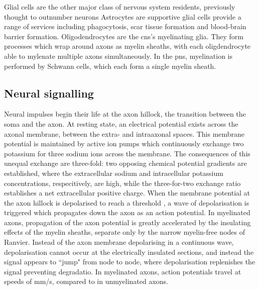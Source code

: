 Glial cells are the other major class of nervous system residents, previously thought to outnumber neurons 
Astrocytes are supportive glial cells provide a range of services including phagocytosis, scar tissue formation and blood-brain barrier formation.
Oligodendrocytes are the \gls{cns}'s myelinating glia.
They form processes which wrap around axons as myelin sheaths, with each oligdendrocyte able to mylenate multiple axons simultaneously.
In the \gls{pns}, myelination is performed by Schwann cells, which each form a single myelin sheath.

\subsection{Neural signalling}

Neural impulses begin their life at the axon hillock, the transition between the soma and the axon.
At resting state, an electrical potential exists across the axonal membrane, between the extra- and intraaxonal spaces.
This membrane potential is maintained by active ion pumps  which continuously exchange two potassium for three sodium ions across the membrane.
The consequences of this unequal exchange are three-fold: two opposing chemical potential gradients are established, where the extracellular sodium and intracellular potassium concentrations, respecitively, are high, while the three-for-two exchange ratio establishes a net extracellular positive charge.
When the membrane potential at the axon hillock is depolarised to reach a threshold , a wave of depolarisation is triggered which propagates down the axon as an action potential. 
In myelinated axons, propagation of the axon potential is greatly accelerated by the insulating effects of the myelin sheaths, separate only by the narrow myelin-free nodes of Ranvier.
Instead of the axon membrane depolarising in a continuous wave, depolarisation cannot occur at the electrically insulated sections, and instead the signal appears to ``jump" from node to node, where depolarisation replenishes the signal preventing degradatio. 
In myelinated axons, action potentials travel at speeds of  mm/s, compared to  in unmyelinated axons.

